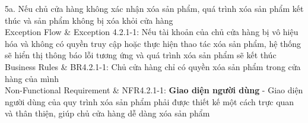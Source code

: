 \begin{usecase_table}
                    5a. Nếu chủ cửa hàng không xác nhận xóa sản phẩm, quá trình xóa sản phẩm kết thúc và sản phẩm không bị xóa khỏi cửa hàng\\
                    \hline
                    Exception Flow & Exception 4.2.1-1: Nếu tài khoản của chủ cửa hàng bị vô hiệu hóa và không có quyền truy cập hoặc thực hiện thao tác xóa sản phẩm, hệ thống sẽ hiển thị thông báo lỗi tương ứng và quá trình xóa sản phẩm sẽ kết thúc\\
                    \hline
                    Business Rules	& BR4.2.1-1: Chủ cửa hàng chỉ có quyền xóa sản phẩm trong cửa hàng của mình\\
                    \hline
                    Non-Functional Requirement & NFR4.2.1-1: \textbf{Giao diện người dùng} - Giao diện người dùng của quy trình xóa sản phẩm phải được thiết kế một cách trực quan và thân thiện, giúp chủ cửa hàng dễ dàng xóa sản phẩm
                    \\
                    \hline
                \end{usecase_table}
            \newpage  
